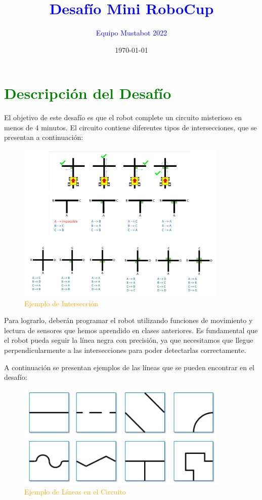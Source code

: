 \documentclass[12pt]{article}
\begin{document}
\title{\textcolor{blue}{Desafío Mini RoboCup}}
\author{\textcolor{blue}{Equipo Mustabot 2022}}
\date{\today}

\maketitle

\section*{\textcolor{green}{Descripción del Desafío}}
El objetivo de este desafío es que el robot complete un circuito misterioso en menos de 4 minutos. El circuito contiene diferentes tipos de intersecciones, que se presentan a continuación:

\begin{figure}[H]
    \centering
    \includegraphics[width=0.9\textwidth]{competencia_rules/reglas.png}
    \caption{\textcolor{orange}{Ejemplo de Intersección}}
    \label{fig:interseccion}
\end{figure}

Para lograrlo, deberán programar el robot utilizando funciones de movimiento y lectura de sensores que hemos aprendido en clases anteriores. Es fundamental que el robot pueda seguir la línea negra con precisión, ya que necesitamos que llegue perpendicularmente a las intersecciones para poder detectarlas correctamente.

A continuación se presentan ejemplos de las líneas que se pueden encontrar en el desafío:

\begin{figure}[H]
    \centering
    \includegraphics[width=0.9\textwidth]{competencia_rules/tiles.png}
    \caption{\textcolor{orange}{Ejemplo de Líneas en el Circuito}}
    \label{fig:lineas}
\end{figure}
\end{document}

